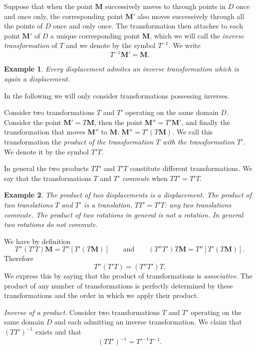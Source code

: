 \documentclass[leqno,11pt]{book}
\numberwithin{equation}{chapter}
\theoremstyle{shape1}
\theoremstyle{shapesmall}
\newtheorem*{ex}{Example}
\newcommand{\somespace}{\vspace{9pt}}
\begin{document}
Suppose that when the point $\mathbf{M}$ successively moves to through points in $D$ once and once only, the corresponding point $\mathbf{M}'$ also moves successively through all the points of $D$ once and only once. The transformation then attaches to each point $\mathbf{M}'$ of $D$ a unique corresponding point $\mathbf{M}$, which we will call the \emph{inverse transformation} of $T$ and we denote by the symbol $T^{-1}$. We write
\[
T^{-1}\mathbf{M}'=\mathbf{M}.
\]

\begin{ex}
  Every displacement admites an inverse transformation which is again a displacement.
\end{ex}

In the following we will only consider transformations possessing inverses.

Consider two transformations $T$ and $T'$ operating on the same domain $D$. Consider the point $\mathbf{M}'=T\mathbf{M}$, then the point $\mathbf{M}''=T'\mathbf{M}'$, and finally the transformation that moves $\mathbf{M}''$ to $\mathbf{M}$: $\mathbf{M}''=T'(T\mathbf{M})$. We call this transformation the \emph{product of the transformation $T$ with the transformation $T'$}. We denote it by the symbol $T'T$.

In general the two products $TT'$ and $T'T$ constitute different transformations. We say that the transformations $T$ and $T'$ \emph{commute} when $TT'=T'T$.

\begin{ex}
  The product of two displacements is a displacement. The product of two translations $T$ and $T'$ is a translation, $TT'=T'T$: any two translations commute. The product of two rotations in general is not a rotation. In general two rotations do not commute.
\end{ex}

We have by definition
\[
T''(T'T)\mathbf{M}=T''[T'(T\mathbf{M})]\qquad\text{and}\qquad(T''T')T\mathbf{M}=T''[T'(T\mathbf{M})].
\]
Therefore
\[
T''(T'T)=(T''T')T.
\]
We express this by saying that the product of transformations is \emph{associative}. The product of any number of transformations is perfectly determined by these transformations and the order in which we apply their product.

\somespace

\emph{Inverse of a product}. Consider two transformations $T$ and $T'$ operating on the same domain $D$ and each admitting an inverse transformation. We claim that $(TT')^{-1}$ exists and that
\[
(TT')^{-1}=T'^{-1}T^{-1}.
\]
\end{document}
